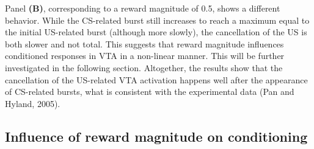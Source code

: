 \documentclass[
  11pt,
  a4paper,
]{scrbook}
\begin{document}
Panel \textbf{(B)}, corresponding to a reward magnitude of 0.5, shows a
different behavior. While the CS-related burst still increases to reach
a maximum equal to the initial US-related burst (although more slowly),
the cancellation of the US is both slower and not total. This suggests
that reward magnitude influences conditioned responses in VTA in a
non-linear manner. This will be further investigated in the following
section. Altogether, the results show that the cancellation of the
US-related VTA activation happens well after the appearance of
CS-related bursts, what is consistent with the experimental data (Pan
and Hyland, 2005).

\subsection{Influence of reward magnitude on
conditioning}\label{sec-finr:rewardmagnitude}
\end{document}
